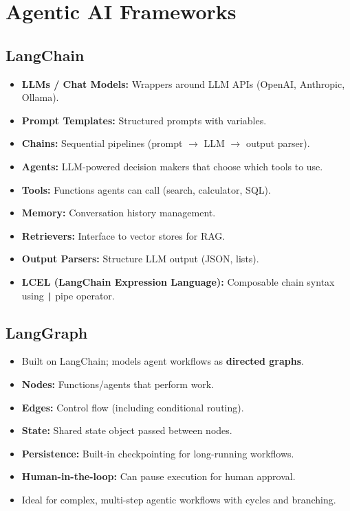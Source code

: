 \documentclass[11pt,a4paper]{article}
\begin{document}
\section{Agentic AI Frameworks}

\subsection{LangChain}

\begin{keybox}
\begin{itemize}[nosep]
  \item \textbf{LLMs / Chat Models:} Wrappers around LLM APIs (OpenAI, Anthropic, Ollama).
  \item \textbf{Prompt Templates:} Structured prompts with variables.
  \item \textbf{Chains:} Sequential pipelines (prompt $\to$ LLM $\to$ output parser).
  \item \textbf{Agents:} LLM-powered decision makers that choose which tools to use.
  \item \textbf{Tools:} Functions agents can call (search, calculator, SQL).
  \item \textbf{Memory:} Conversation history management.
  \item \textbf{Retrievers:} Interface to vector stores for RAG.
  \item \textbf{Output Parsers:} Structure LLM output (JSON, lists).
  \item \textbf{LCEL (LangChain Expression Language):} Composable chain syntax using \texttt{|} pipe operator.
\end{itemize}
\end{keybox}

\subsection{LangGraph}
\begin{itemize}[nosep]
  \item Built on LangChain; models agent workflows as \textbf{directed graphs}.
  \item \textbf{Nodes:} Functions/agents that perform work.
  \item \textbf{Edges:} Control flow (including conditional routing).
  \item \textbf{State:} Shared state object passed between nodes.
  \item \textbf{Persistence:} Built-in checkpointing for long-running workflows.
  \item \textbf{Human-in-the-loop:} Can pause execution for human approval.
  \item Ideal for complex, multi-step agentic workflows with cycles and branching.
\end{itemize}
\end{document}
